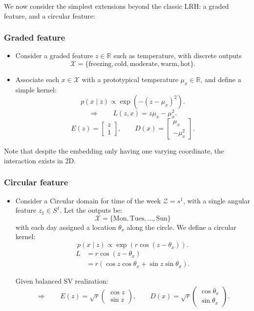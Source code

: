 \documentclass[11pt]{article}
\begin{document}
We now consider the simplest extensions beyond the classic LRH: a graded feature, and a circular feature:

\subsubsection{Graded feature}

\begin{itemize}
\item Consider a graded feature $z\in\mathbb R$ such as temperature, with discrete outputs
\[
\mathcal X=\{\text{freezing},\text{cold},\text{moderate},\text{warm},\text{hot}\}.
\]

\item Associate each $x\in\mathcal X$ with a prototypical temperature $\mu_x\in\mathbb R$, and define a simple kernel:
\[
p(x\mid z)\propto\exp\!\left(-(z-\mu_x)^2\right).
\]
\[
\Longrightarrow\qquad L(z,x)=z\mu_x-\mu_x^2.
\]
\[
E(z)=
\begin{bmatrix}
z\\
1
\end{bmatrix},
\qquad
D(x)=
\begin{bmatrix}
\mu_x\\
-\mu_x^2
\end{bmatrix}.
\]
\end{itemize}

Note that despite the embedding only having one varying coordinate, the interaction exists in 2D.

\subsubsection{Circular feature}

\begin{itemize}
\item Consider a Circular domain for time of the week $\mathcal Z=s^1$, with a single angular feature $z_1\in S^1$. Let the outputs be:
\[
\mathcal X=\{\text{Mon},\text{Tues},\ldots,\text{Sun}\}
\]
with each day assigned a location $\theta_x$ along the circle. We define a circular kernel:
\[
p(x\mid z)\propto\exp\!\left(r\cos(z-\theta_x)\right).
\]
\begin{align*}
L
&=r\cos(z-\theta_x)\\
&=r\left(\cos z\cos\theta_x+\sin z\sin\theta_x\right).
\end{align*}

Given balanced SV realization:
\[
\Longrightarrow\qquad
E(z)=\sqrt r
\begin{pmatrix}
\cos z\\
\sin z
\end{pmatrix},
\qquad
D(x)=\sqrt r
\begin{pmatrix}
\cos\theta_x\\
\sin\theta_x
\end{pmatrix}.
\]
\end{itemize}
\end{document}
